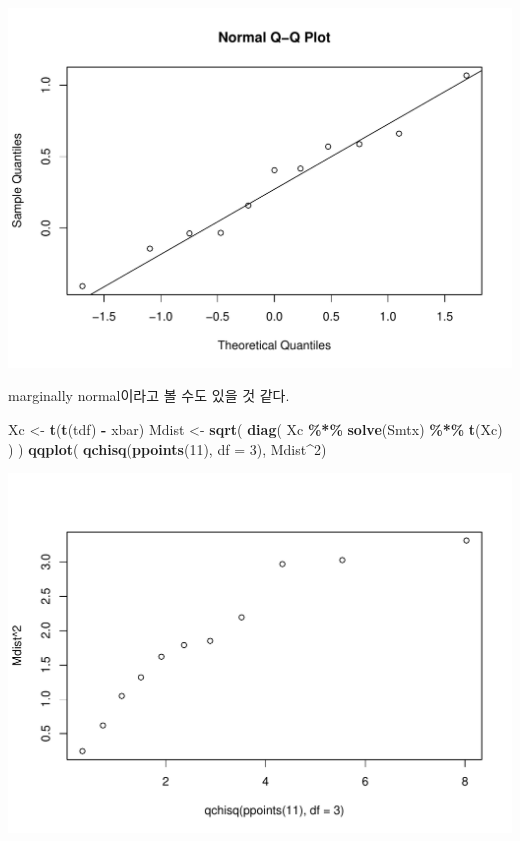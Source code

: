 \documentclass[
]{article}
\newenvironment{Shaded}{\begin{snugshade}}{\end{snugshade}}
\newcommand{\AttributeTok}[1]{\textcolor[rgb]{0.13,0.29,0.53}{#1}}
\newcommand{\DecValTok}[1]{\textcolor[rgb]{0.00,0.00,0.81}{#1}}
\newcommand{\FunctionTok}[1]{\textcolor[rgb]{0.13,0.29,0.53}{\textbf{#1}}}
\newcommand{\NormalTok}[1]{#1}
\newcommand{\OtherTok}[1]{\textcolor[rgb]{0.56,0.35,0.01}{#1}}
\newcommand{\SpecialCharTok}[1]{\textcolor[rgb]{0.81,0.36,0.00}{\textbf{#1}}}
\begin{document}
\begin{center}\includegraphics[width=0.8\linewidth]{multi_hw7_files/figure-latex/unnamed-chunk-17-2} \end{center}

marginally normal이라고 볼 수도 있을 것 같다.

\begin{Shaded}
\begin{Highlighting}[]
\NormalTok{Xc }\OtherTok{\textless{}{-}} \FunctionTok{t}\NormalTok{(}\FunctionTok{t}\NormalTok{(tdf) }\SpecialCharTok{{-}}\NormalTok{ xbar)}
\NormalTok{Mdist }\OtherTok{\textless{}{-}} \FunctionTok{sqrt}\NormalTok{( }\FunctionTok{diag}\NormalTok{( Xc }\SpecialCharTok{\%*\%} \FunctionTok{solve}\NormalTok{(Smtx) }\SpecialCharTok{\%*\%} \FunctionTok{t}\NormalTok{(Xc) ) ) }
\FunctionTok{qqplot}\NormalTok{( }\FunctionTok{qchisq}\NormalTok{(}\FunctionTok{ppoints}\NormalTok{(}\DecValTok{11}\NormalTok{), }\AttributeTok{df =} \DecValTok{3}\NormalTok{), Mdist}\SpecialCharTok{\^{}}\DecValTok{2}\NormalTok{)}
\end{Highlighting}
\end{Shaded}

\begin{center}\includegraphics[width=0.8\linewidth]{multi_hw7_files/figure-latex/unnamed-chunk-18-1} \end{center}
\end{document}
